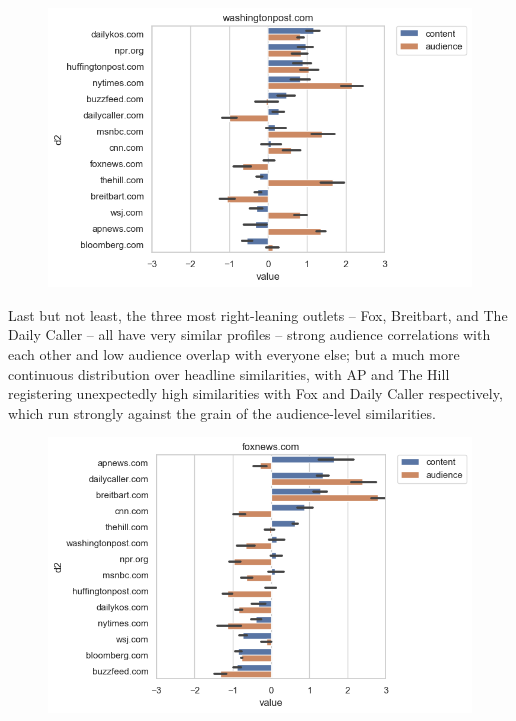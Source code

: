 \documentclass{scrartcl}
\begin{document}
\begin{figure}[H]
  \centering
  \includegraphics[width=\textwidth]{figures/ca-washingtonpost-composite.png}
\end{figure}

Last but not least, the three most right-leaning outlets -- Fox, Breitbart, and The Daily Caller -- all have very similar profiles -- strong audience correlations with each other and low audience overlap with everyone else; but a much more continuous distribution over headline similarities, with AP and The Hill registering unexpectedly high similarities with Fox and Daily Caller respectively, which run strongly against the grain of the audience-level similarities.

\begin{figure}[H]
  \centering
  \includegraphics[width=\textwidth]{figures/ca-foxnews-composite.png}
\end{figure}
\end{document}
